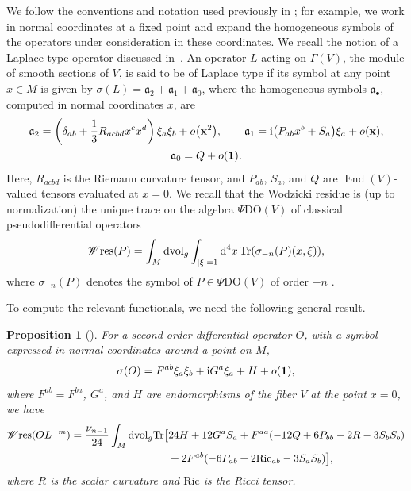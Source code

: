 \documentclass[10pt,a4paper]{amsart}
\numberwithin{equation}{section}
\newtheorem{Proposition}[Theorem]{Proposition}
\theoremstyle{definition}
\def\W{\mathscr{W} \mathrm{res}}
\def\Tr{\mathrm{Tr}}
\def\PDO{\Psi\mathrm{DO}}
\def\dv{\mathrm{dvol}_g}
\begin{document}
We follow the conventions and notation used previously in \cite{dabrowski2023,bochniak2025}; for example, we work in normal coordinates at a fixed point and expand the homogeneous symbols of the operators under consideration in these coordinates. We recall the notion of a Laplace-type operator discussed in~\cite{bochniak2025}. An operator $L$ acting on $\Gamma(V)$, the module of smooth sections of $V$, is said to be of Laplace type if its symbol at any point $x \in M$ is given by $\sigma(L) = \mathfrak{a}_2 + \mathfrak{a}_1 + \mathfrak{a}_0$, where the homogeneous symbols $\mathfrak{a}_\bullet$, computed in normal coordinates $x$, are
\begin{gather}
		\mathfrak{a}_2= \left(\delta_{ab}+\frac{1}{3}R_{acbd}x^c x^d \right)\xi_a\xi_b + o\bigl({\bf x}^2\bigr),\qquad
		\mathfrak{a}_1={\rm i}\bigl(P_{ab}x^b + S_a\bigr)\xi_a +o({\bf x}),\nonumber\\
		\mathfrak{a}_0=Q+o({\bf 1}).\label{symbolL}
\end{gather}
Here, $R_{acbd}$ is the Riemann curvature tensor, and $P_{ab}$, $S_a$, and $Q$ are $\operatorname{End}(V)$-valued tensors evaluated at $x=0$. We recall that the Wodzicki residue \cite{Wodzicki} is (up to normalization) the unique trace on the algebra $\PDO(V)$ of classical pseudodifferential operators
\[
	\W(P)=\int_M\dv \int_{|\xi|=1} {\rm d}^4x \, \Tr(\sigma_{-n}(P)(x,\xi)),
\]
where $\sigma_{-n}(P)$ denotes the symbol of $P \in \PDO(V)$ of order $-n$ \cite{Gilkey}.

To compute the relevant functionals, we need the following general result.

\begin{Proposition}[{\cite[Proposition~I.2]{bochniak2025}}]
	\label{prop:main}
	For a second-order differential operator $O$, with a symbol expressed in normal coordinates around a point on $M$,
	\[\sigma(O)=F^{ab}\xi_a\xi_b + {\rm i} G^a \xi_a +H + o({\bf 1}),\]
	where $F^{ab} = F^{ba}$, $G^a$, and $H$ are endomorphisms of the fiber $V$ at the point $x = 0$, we have
	\begin{align*}%
		\W(OL^{-m})={}&\frac{\nu_{n-1}}{24}\int_M \dv\Tr \bigl[24H +12 G^aS_a +F^{aa}(-12 Q+ 6P_{bb}-2 R - 3 S_b S_b) \\
		& \hphantom{\frac{\nu_{n-1}}{24}\int_M \dv\Tr \bigl[}{} + 2 F^{ab}(-6 P_{ab}+2 \mathrm{Ric}_{ab}-3S_a S_b)\bigr],
	\end{align*}
where $R$ is the scalar curvature and $\mathrm{Ric}$ is the Ricci tensor.
\end{Proposition}
\end{document}
